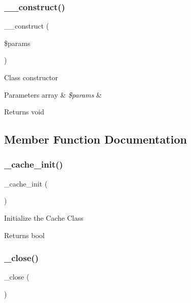 \subsubsection{\texorpdfstring{\+\_\+\+\_\+construct()}{\_\_construct()}}
{\footnotesize\ttfamily \+\_\+\+\_\+construct (\begin{DoxyParamCaption}\item[{}]{\$params }\end{DoxyParamCaption})}

Class constructor


\begin{DoxyParams}[1]{Parameters}
array & {\em \$params} & \\
\hline
\end{DoxyParams}
\begin{DoxyReturn}{Returns}
void 
\end{DoxyReturn}


\subsection{Member Function Documentation}
\mbox{\label{class_c_i___d_b__driver_a3991c9b589034f12f6fed26d83ac47e4}} 
\subsubsection{\texorpdfstring{\+\_\+cache\+\_\+init()}{\_cache\_init()}}
{\footnotesize\ttfamily \+\_\+cache\+\_\+init (\begin{DoxyParamCaption}{ }\end{DoxyParamCaption})\hspace{0.3cm}{\ttfamily [protected]}}

Initialize the Cache Class

\begin{DoxyReturn}{Returns}
bool 
\end{DoxyReturn}
\mbox{\label{class_c_i___d_b__driver_a4d9082658000e5ede8312067c6dda9db}} 
\subsubsection{\texorpdfstring{\+\_\+close()}{\_close()}}
{\footnotesize\ttfamily \+\_\+close (\begin{DoxyParamCaption}{ }\end{DoxyParamCaption})\hspace{0.3cm}{\ttfamily [protected]}}

